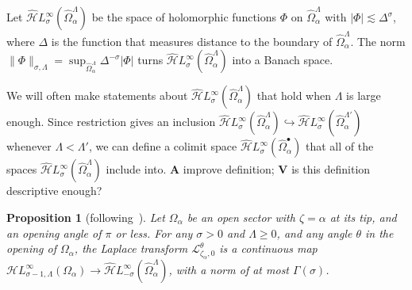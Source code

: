 \documentclass{article}
\newcommand{\singexp}[2]{\mathcal{H}L^\infty_{#1, #2}}
\newcommand{\dualsingexp}[1]{\widehat{\mathcal{H}}L^\infty_{#1}}
\newcommand{\laplace}{\mathcal{L}}
\theoremstyle{definition}
\theoremstyle{plain}
\newtheorem{prop}[definition]{Proposition}
\newenvironment{todo}{\color{Coral}}{\color{black}}
\begin{document}
Let $\dualsingexp{\sigma}(\widehat{\Omega}_\alpha^\Lambda)$ be the space of holomorphic functions $\Phi$ on $\widehat{\Omega}_\alpha^\Lambda$ with $|\Phi| \lesssim \Delta^\sigma$, where $\Delta$ is the function that measures distance to the boundary of $\widehat{\Omega}_\alpha^\Lambda$. The norm $\|\Phi\|_{\sigma, \Lambda} = \sup_{\widehat{\Omega}_\alpha^\Lambda} \Delta^{-\sigma} |\Phi|$ turns $\dualsingexp{\sigma}(\widehat{\Omega}_\alpha^\Lambda)$ into a Banach space.

We will often make statements about $\dualsingexp{\sigma}(\widehat{\Omega}_\alpha^\Lambda)$ that hold when $\Lambda$ is large enough. Since restriction gives an inclusion $\dualsingexp{\sigma}(\widehat{\Omega}_\alpha^\Lambda) \hookrightarrow \dualsingexp{\sigma}(\widehat{\Omega}_\alpha^{\Lambda'})$ whenever $\Lambda < \Lambda'$, we can define a colimit space $\dualsingexp{\sigma}(\widehat{\Omega}_\alpha^\bullet)$ that all of the spaces $\dualsingexp{\sigma}(\widehat{\Omega}_\alpha^\Lambda)$ include into. \begin{todo}\textbf{A} improve definition; \textbf{V} is this definition descriptive enough?\end{todo}
\begin{todo}\par
[Cite \cite{sternin1995borel} better for the theorem. Note that these results don't depend on which cotangent fiber we're mapping into. $\widehat{\Omega}$ is defined across all cotangent fibers over ordinary points.]
\end{todo}
%
\begin{prop}[following~\cite{sternin1995borel}]\label{prop:laplace-cont}
Let $\Omega_\alpha$ be an open sector with $\zeta = \alpha$ at its tip, and an opening angle of $\pi$ or less. For any $\sigma > 0$ and $\Lambda \ge 0$, and any angle $\theta$ in the opening of $\Omega_\alpha$, the Laplace transform $\laplace_{\zeta_\alpha, 0}^\theta$ is a continuous map $\singexp{\sigma-1}{\Lambda}(\Omega_\alpha) \to \dualsingexp{-\sigma}(\widehat{\Omega}_\alpha^\Lambda)$, with a norm of at most $\Gamma(\sigma)$.
\end{prop}
\end{document}
